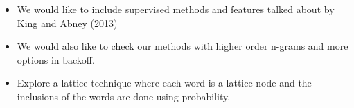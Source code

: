 \documentclass[a0paper,fontscale=0.3]{baposter}  %
\begin{document}
\begin{poster}
{\begin{itemize}
			\item	We would like to include supervised methods and features talked about by King and Abney (2013)
		\newline	

			\item	We would also like to check our methods with higher order n-grams and more options in backoff.
		\newline	

			\item	Explore a lattice technique where each word is a lattice node and the inclusions of the words are done using probability.
		\newline	
			\end{itemize}
		}

\end{poster}
\end{document}
